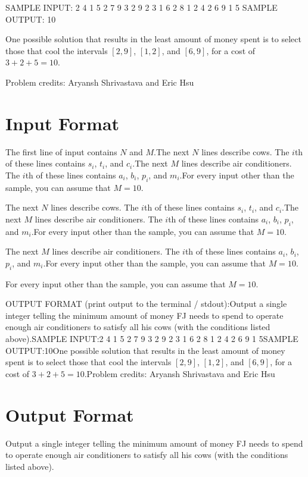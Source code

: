 \documentclass[12pt]{article}
\begin{document}
SAMPLE INPUT:
2 4
1 5 2
7 9 3
2 9 2 3
1 6 2 8
1 2 4 2
6 9 1 5
SAMPLE OUTPUT: 
10

One possible solution that results in the least amount of money spent is to
select those that cool the intervals $[2, 9]$, $[1, 2]$, and $[6, 9]$, for a
cost of $3 + 2 + 5 = 10$.


Problem credits: Aryansh Shrivastava and Eric Hsu



\section*{Input Format}
The first line of input contains $N$ and $M$.The next $N$ lines describe cows.  The $i$th of these lines contains $s_i$,
$t_i$, and $c_i$.The next $M$ lines describe air conditioners.  The $i$th of these lines contains
$a_i$, $b_i$, $p_i$, and $m_i$.For every input other than the sample, you can assume that $M = 10$.

The next $N$ lines describe cows.  The $i$th of these lines contains $s_i$,
$t_i$, and $c_i$.The next $M$ lines describe air conditioners.  The $i$th of these lines contains
$a_i$, $b_i$, $p_i$, and $m_i$.For every input other than the sample, you can assume that $M = 10$.

The next $M$ lines describe air conditioners.  The $i$th of these lines contains
$a_i$, $b_i$, $p_i$, and $m_i$.For every input other than the sample, you can assume that $M = 10$.

For every input other than the sample, you can assume that $M = 10$.

OUTPUT FORMAT (print output to the terminal / stdout):Output a single integer telling the minimum amount of money FJ needs to spend to
operate enough air conditioners to satisfy all his cows (with the conditions
listed above).SAMPLE INPUT:2 4
1 5 2
7 9 3
2 9 2 3
1 6 2 8
1 2 4 2
6 9 1 5SAMPLE OUTPUT:10One possible solution that results in the least amount of money spent is to
select those that cool the intervals $[2, 9]$, $[1, 2]$, and $[6, 9]$, for a
cost of $3 + 2 + 5 = 10$.Problem credits: Aryansh Shrivastava and Eric Hsu

\section*{Output Format}
Output a single integer telling the minimum amount of money FJ needs to spend to
operate enough air conditioners to satisfy all his cows (with the conditions
listed above).
\end{document}
